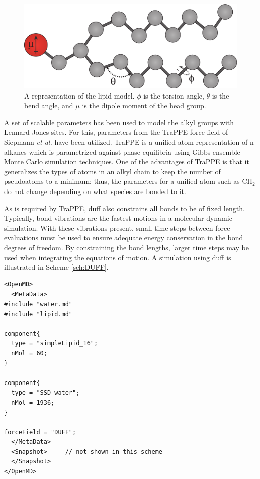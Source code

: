 \documentclass[]{book}
\begin{document}
\begin{figure}
\centering
\includegraphics[width=\linewidth]{lipidModel.pdf}
\caption[A representation of a lipid model in {\sc duff}]{A
representation of the lipid model. $\phi$ is the torsion angle,
$\theta$ is the bend angle, and $\mu$ is the dipole moment of the head
group.}
\label{fig:lipidModel}
\end{figure}

A set of scalable parameters has been used to model the alkyl groups
with Lennard-Jones sites. For this, parameters from the TraPPE force
field of Siepmann \emph{et al.}\cite{Siepmann1998} have been
utilized. TraPPE is a unified-atom representation of n-alkanes which
is parametrized against phase equilibria using Gibbs ensemble Monte
Carlo simulation techniques.\cite{Siepmann1998} One of the advantages
of TraPPE is that it generalizes the types of atoms in an alkyl chain
to keep the number of pseudoatoms to a minimum; thus, the parameters
for a unified atom such as $\text{CH}_2$ do not change depending on
what species are bonded to it.

As is required by TraPPE, {\sc duff} also constrains all bonds to be
of fixed length. Typically, bond vibrations are the fastest motions in
a molecular dynamic simulation.  With these vibrations present, small
time steps between force evaluations must be used to ensure adequate
energy conservation in the bond degrees of freedom. By constraining
the bond lengths, larger time steps may be used when integrating the
equations of motion. A simulation using {\sc duff} is illustrated in
Scheme \ref{sch:DUFF}.

\begin{lstlisting}[float,caption={[Invocation of {\sc duff}]A portion
of a startup file showing a simulation utilizing {\sc
duff}},label={sch:DUFF}]  
<OpenMD>
  <MetaData>
#include "water.md"
#include "lipid.md"

component{
  type = "simpleLipid_16";
  nMol = 60;
}

component{
  type = "SSD_water";
  nMol = 1936;
}

forceField = "DUFF";
  </MetaData>
  <Snapshot>     // not shown in this scheme
  </Snapshot>
</OpenMD>
\end{lstlisting}
\end{document}

